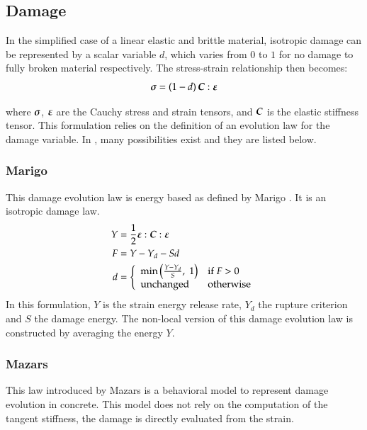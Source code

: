 \subsection{Damage}

In the  simplified case of a  linear elastic and brittle  material, isotropic
damage can be represented by a scalar variable $d$, which varies from $0$ to $1$
for  no  damage  to  fully  broken  material  respectively.  The  stress-strain
relationship then becomes:
\begin{equation*}
  \boldsymbol{\sigma} = (1-d)\, \boldsymbol{C}:\boldsymbol{\varepsilon}
\end{equation*}

where  $\boldsymbol{\sigma}$,  $\boldsymbol{\varepsilon}$ are  the  Cauchy  stress and  strain
tensors, and $\boldsymbol{C}$ is the elastic stiffness tensor. This formulation relies
on the definition of an evolution law for the damage variable. In \akantu, many
possibilities exist and they are listed below.

\subsubsection{Marigo}

This damage evolution law is energy based as defined by Marigo \cite{marigo81a,
  lemaitre96a}. It is an isotropic damage law.
\begin{align}
  Y &= \frac{1}{2}\boldsymbol{\varepsilon}:\boldsymbol{C}:\boldsymbol{\varepsilon}\\
  F &= Y - Y_d - S d\\
  d &= \left\{
    \begin{array}{l l}
      \mathrm{min}\left(\frac{Y-Y_d}{S},\;1\right) & \mathrm{if}\; F > 0\\
      \mathrm{unchanged} & \mathrm{otherwise}
    \end{array}
  \right.
\end{align}
In this formulation, $Y$ is the strain energy release rate, $Y_d$ the
rupture criterion and $S$ the damage energy.  The non-local version of
this damage evolution law is constructed by averaging the energy $Y$.

\subsubsection{Mazars}

This law introduced by Mazars \cite{mazars84a} is a behavioral model to
represent damage evolution in concrete. This model does not rely on the computation of the tangent stiffness, the damage is directly evaluated from the strain.

